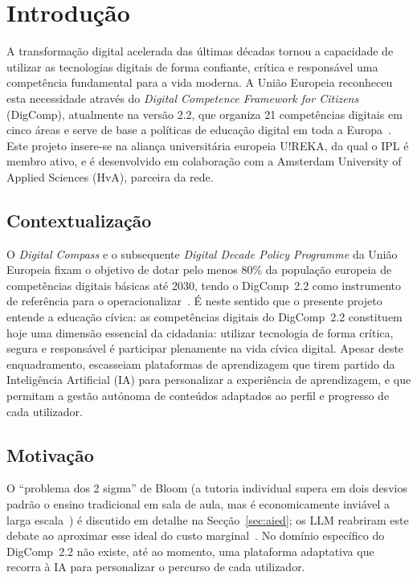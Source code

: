 %
%
\chapter{Introdução} \label{cap:intro}

A transformação digital acelerada das últimas décadas tornou a capacidade de utilizar as tecnologias digitais de forma confiante, crítica e responsável uma competência fundamental para a vida moderna. A União Europeia reconheceu esta necessidade através do \textit{Digital Competence Framework for Citizens} (DigComp), atualmente na versão 2.2, que organiza 21 competências digitais em cinco áreas e serve de base a políticas de educação digital em toda a Europa~\cite{digcomp22}. Este projeto insere-se na aliança universitária europeia U!REKA, da qual o IPL é membro ativo, e é desenvolvido em colaboração com a Amsterdam University of Applied Sciences (HvA), parceira da rede.

\section{Contextualização} \label{sec:contexto}

O \textit{Digital Compass} e o subsequente \textit{Digital Decade Policy Programme} da União Europeia fixam o objetivo de dotar pelo menos 80\% da população europeia de competências digitais básicas até 2030, tendo o DigComp~2.2 como instrumento de referência para o operacionalizar~\cite{digitaldecade2022,digcomp22}. É neste sentido que o presente projeto entende a educação cívica: as competências digitais do DigComp~2.2 constituem hoje uma dimensão essencial da cidadania: utilizar tecnologia de forma crítica, segura e responsável é participar plenamente na vida cívica digital.
Apesar deste enquadramento, escasseiam plataformas de aprendizagem que tirem partido da Inteligência Artificial (IA) para personalizar a experiência de aprendizagem, e que permitam a gestão autónoma de conteúdos adaptados ao perfil e progresso de cada utilizador.

\section{Motivação} \label{sec:motivacao}

O ``problema dos 2 sigma'' de Bloom (a tutoria individual supera em dois desvios padrão o ensino tradicional em sala de aula, mas é economicamente inviável a larga escala~\cite{bloom1984}) é discutido em detalhe na Secção~\ref{sec:aied}; os LLM reabriram este debate ao aproximar esse ideal do custo marginal~\cite{kasneci2023}. No domínio específico do DigComp~2.2 não existe, até ao momento, uma plataforma adaptativa que recorra à IA para personalizar o percurso de cada utilizador.

